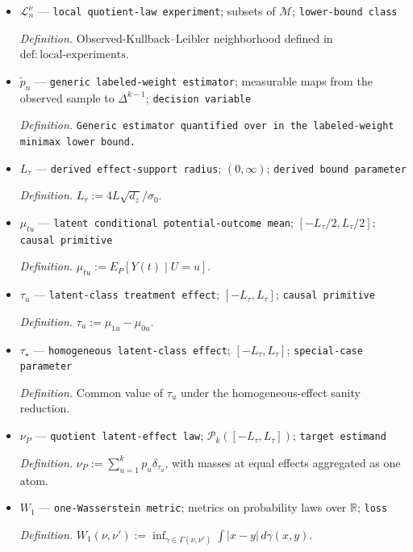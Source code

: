 \documentclass{article}
\begin{document}
\begin{itemize}
  \item \(\mathcal L_{n}^{\nu}\) --- \texttt{local quotient-\allowbreak{}law experiment}; subsets of \(\mathcal M\); \texttt{lower-\allowbreak{}bound class}
  \par\smallskip\noindent\emph{Definition.} Observed-Kullback--Leibler neighborhood defined in \(\mathrm{def:local\text{-}experiments}\).
  \item \(\widetilde p_n\) --- \texttt{generic labeled-\allowbreak{}weight estimator}; measurable maps from the observed sample to \(\Delta^{k-1}\); \texttt{decision variable}
  \par\smallskip\noindent\emph{Definition.} \texttt{Generic estimator quantified over in the labeled-\allowbreak{}weight minimax lower bound.}
  \item \(L_{\tau}\) --- \texttt{derived effect-\allowbreak{}support radius}; \((0,\infty)\); \texttt{derived bound parameter}
  \par\smallskip\noindent\emph{Definition.} \(L_{\tau}:=4L\sqrt{d_z}/\sigma_0\).
  \item \(\mu_{tu}\) --- \texttt{latent conditional potential-\allowbreak{}outcome mean}; \([-L_{\tau}/2,L_{\tau}/2]\); \texttt{causal primitive}
  \par\smallskip\noindent\emph{Definition.} \(\mu_{tu}:=E_P[Y(t)\mid U=u]\).
  \item \(\tau_u\) --- \texttt{latent-\allowbreak{}class treatment effect}; \([-L_{\tau},L_{\tau}]\); \texttt{causal primitive}
  \par\smallskip\noindent\emph{Definition.} \(\tau_u:=\mu_{1u}-\mu_{0u}\).
  \item \(\tau_\star\) --- \texttt{homogeneous latent-\allowbreak{}class effect}; \([-L_{\tau},L_{\tau}]\); \texttt{special-\allowbreak{}case parameter}
  \par\smallskip\noindent\emph{Definition.} Common value of \(\tau_u\) under the homogeneous-effect sanity reduction.
  \item \(\nu_P\) --- \texttt{quotient latent-\allowbreak{}effect law}; \(\mathcal P_k([-L_{\tau},L_{\tau}])\); \texttt{target estimand}
  \par\smallskip\noindent\emph{Definition.} \(\nu_P:=\sum_{u=1}^k p_u\delta_{\tau_u}\), with masses at equal effects aggregated as one atom.
  \item \(W_1\) --- \texttt{one-\allowbreak{}Wasserstein metric}; metrics on probability laws over \(\mathbb R\); \texttt{loss}
  \par\smallskip\noindent\emph{Definition.} \(W_1(\nu,\nu'):=\inf_{\gamma\in\Gamma(\nu,\nu')}\int|x-y|\,d\gamma(x,y)\).

\end{itemize}
\end{document}
